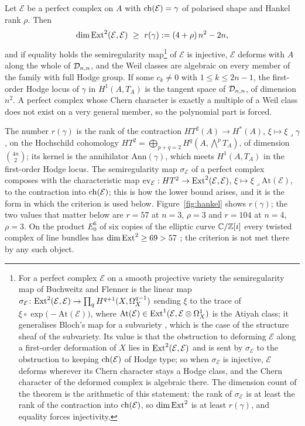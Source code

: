 \begin{theorem}\label{thm:criterion}
Let $\mathcal{E}$ be a perfect complex on $A$ with $\mathrm{ch}(\mathcal{E})=\gamma$ of polarised shape and Hankel rank $\rho$. Then
\[
\dim\Ext^{2}(\mathcal{E},\mathcal{E})\ \ge\ r(\gamma):=(4+\rho)\,n^{2}-2n,
\]
and if equality holds the semiregularity map\footnote{For a perfect complex $\mathcal{E}$ on a smooth projective variety the semiregularity map of Buchweitz and Flenner \cite{BF03} is the linear map $\sigma_{\mathcal{E}}\colon\mathrm{Ext}^{2}(\mathcal{E},\mathcal{E})\to\prod_{q}H^{q+1}(X,\Omega^{q-1}_{X})$ sending $\xi$ to the trace of $\xi\circ\exp\bigl(-\mathrm{At}(\mathcal{E})\bigr)$, where $\mathrm{At}(\mathcal{E})\in\mathrm{Ext}^{1}(\mathcal{E},\mathcal{E}\otimes\Omega^{1}_{X})$ is the Atiyah class; it generalises Bloch's map for a subvariety \cite{Blo72}, which is the case of the structure sheaf of the subvariety. Its value is that the obstruction to deforming $\mathcal{E}$ along a first-order deformation of $X$ lies in $\mathrm{Ext}^{2}(\mathcal{E},\mathcal{E})$ and is sent by $\sigma_{\mathcal{E}}$ to the obstruction to keeping $\mathrm{ch}(\mathcal{E})$ of Hodge type; so when $\sigma_{\mathcal{E}}$ is injective, $\mathcal{E}$ deforms wherever its Chern character stays a Hodge class, and the Chern character of the deformed complex is algebraic there. The dimension count of the theorem is the arithmetic of this statement: the rank of $\sigma_{\mathcal{E}}$ is at least the rank of the contraction into $\mathrm{ch}(\mathcal{E})$, so $\dim\mathrm{Ext}^{2}$ is at least $r(\gamma)$, and equality forces injectivity.} of $\mathcal{E}$ is injective, $\mathcal{E}$ deforms with $A$ along the whole of $\mathcal{D}_{n,n}$, and the Weil classes are algebraic on every member of the family with full Hodge group. If some $c_{k}\ne0$ with $1\le k\le 2n-1$, the first-order Hodge locus of $\gamma$ in $H^{1}(A,T_{A})$ is the tangent space of $\mathcal{D}_{n,n}$, of dimension $n^{2}$. A perfect complex whose Chern character is exactly a multiple of a Weil class does not exist on a very general member, so the polynomial part is forced.
\end{theorem}

The number $r(\gamma)$ is the rank of the contraction $HT^{2}(A)\to H^{*}(A)$, $\xi\mapsto\xi\lrcorner\gamma$, on the Hochschild cohomology $HT^{2}=\bigoplus_{p+q=2}H^{q}(A,\bigwedge^{p}T_{A})$, of dimension $\binom{4n}{2}$; its kernel is the annihilator $\mathrm{Ann}(\gamma)$, which meets $H^{1}(A,T_{A})$ in the first-order Hodge locus. The semiregularity map $\sigma_{\mathcal{E}}$ of a perfect complex composes with the characteristic map $\mathrm{ev}_{\mathcal{E}}:HT^{2}\to\mathrm{Ext}^{2}(\mathcal{E},\mathcal{E})$, $\xi\mapsto\xi\lrcorner\mathrm{At}(\mathcal{E})$, to the contraction into $\mathrm{ch}(\mathcal{E})$; this is how the lower bound arises, and it is the form in which the criterion is used below. Figure~\ref{fig:hankel} shows $r(\gamma)$; the two values that matter below are $r=57$ at $n=3$, $\rho=3$ and $r=104$ at $n=4$, $\rho=3$. On the product $E_{0}^{6}$ of six copies of the elliptic curve $\mathbb{C}/\mathbb{Z}[i]$ every twisted complex of line bundles has $\dim\mathrm{Ext}^{2}\ge69>57$ \cite[Thm.~18.35]{BMB26}; the criterion is not met there by any such object.

